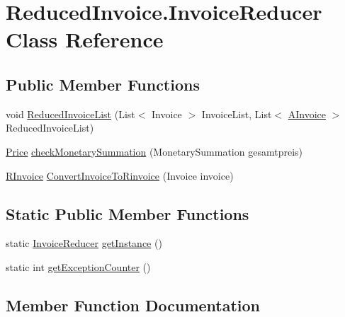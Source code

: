 \hypertarget{class_reduced_invoice_1_1_invoice_reducer}{}\section{Reduced\+Invoice.\+Invoice\+Reducer Class Reference}
\label{class_reduced_invoice_1_1_invoice_reducer}
\subsection*{Public Member Functions}
\begin{DoxyCompactItemize}
\item 
void \hyperlink{class_reduced_invoice_1_1_invoice_reducer_af064188d62db15e810468e4811af6cc5}{Reduced\+Invoice\+List} (List$<$ Invoice $>$ Invoice\+List, List$<$ \hyperlink{class_reduced_invoice_1_1_a_invoice}{A\+Invoice} $>$ Reduced\+Invoice\+List)
\item 
\hyperlink{class_reduced_invoice_1_1_price}{Price} \hyperlink{class_reduced_invoice_1_1_invoice_reducer_a6caff41f142502c44cbeefc7b1e44c9d}{check\+Monetary\+Summation} (Monetary\+Summation gesamtpreis)
\item 
\hyperlink{class_reduced_invoice_1_1_r_invoice}{R\+Invoice} \hyperlink{class_reduced_invoice_1_1_invoice_reducer_a424cf7731d065d541c0a1bc613f5834a}{Convert\+Invoice\+To\+Rinvoice} (Invoice invoice)
\end{DoxyCompactItemize}
\subsection*{Static Public Member Functions}
\begin{DoxyCompactItemize}
\item 
static \hyperlink{class_reduced_invoice_1_1_invoice_reducer}{Invoice\+Reducer} \hyperlink{class_reduced_invoice_1_1_invoice_reducer_ad4fafc7b331a78ef243c3e3ba88803da}{get\+Instance} ()
\item 
static int \hyperlink{class_reduced_invoice_1_1_invoice_reducer_abe80712f42719b26d669ecce7065f025}{get\+Exception\+Counter} ()
\end{DoxyCompactItemize}


\subsection{Member Function Documentation}
